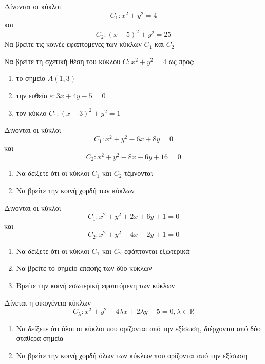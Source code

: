 \documentclass{../../presentation}
\begin{document}
\begin{askisi}
  Δίνονται οι κύκλοι
  $$C_1:x^2+y^2=4$$
  και
  $$C_2:(x-5)^2+y^2=25$$
  Να βρείτε τις κοινές εφαπτόμενες των κύκλων $C_1$ και $C_2$

\end{askisi}

\begin{askisi}
  Να βρείτε τη σχετική θέση του κύκλου $C:x^2+y^2=4$ ως προς:
  \begin{enumerate}
    \item<1-> το σημείο $Α(1,3)$
    \item<2-> την ευθεία $ε:3x+4y-5=0$
    \item<3-> τον κύκλο $C_1:(x-3)^2+y^2=1$
  \end{enumerate}

\end{askisi}

\begin{askisi}
  Δίνονται οι κύκλοι
  $$C_1:x^2+y^2-6x+8y=0$$
  και
  $$C_2:x^2+y^2-8x-6y+16=0$$
  \begin{enumerate}
    \item<1-> Να δείξετε ότι οι κύκλοι $C_1$ και $C_2$ τέμνονται
    \item<2-> Να βρείτε την κοινή χορδή των κύκλων
  \end{enumerate}

\end{askisi}

\begin{askisi}
  Δίνονται οι κύκλοι
  $$C_1:x^2+y^2+2x+6y+1=0$$
  και
  $$C_2:x^2+y^2-4x-2y+1=0$$
  \begin{enumerate}
    \item<1-> Να δείξετε ότι οι κύκλοι $C_1$ και $C_2$ εφάπτονται εξωτερικά
    \item<2-> Να βρείτε το σημείο επαφής των δύο κύκλων
    \item<3-> Βρείτε την κοινή εσωτερική εφαπτόμενη των κύκλων
  \end{enumerate}

\end{askisi}

\begin{askisi}
  Δίνεται η οικογένεια κύκλων
  $$C_λ:x^2+y^2-4λx+2λy-5=0,λ\in\mathbb{R}$$
  \begin{enumerate}
    \item<1-> Να δείξετε ότι όλοι οι κύκλοι που ορίζονται από την εξίσωση, διέρχονται από δύο σταθερά σημεία
    \item<2-> Να βρείτε την κοινή χορδή όλων των κύκλων που ορίζονται από την εξίσωση
  \end{enumerate}

\end{askisi}
\end{document}
